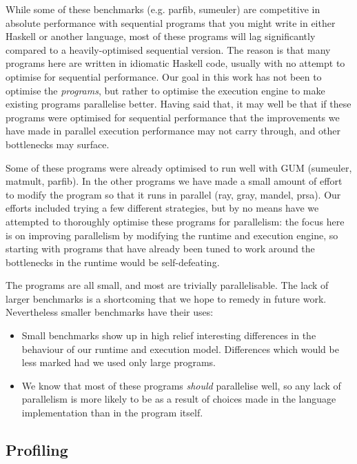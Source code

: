 \documentclass[twocolumn,9pt]{sigplanconf}
\begin{document}
While some of these benchmarks (e.g. parfib, sumeuler) are competitive
in absolute performance with sequential programs that you might write
in either Haskell or another language, most of these programs will lag
significantly compared to a heavily-optimised sequential version.  The
reason is that many programs here are written in idiomatic Haskell
code, usually with no attempt to optimise for sequential performance.
Our goal in this work has not been to optimise the \emph{programs},
but rather to optimise the execution engine to make existing programs
parallelise better.  Having said that, it may well be that if these
programs were optimised for sequential performance that the
improvements we have made in parallel execution performance may not
carry through, and other bottlenecks may surface.

Some of these programs were already optimised to run well with GUM
(sumeuler, matmult, parfib).  In the other programs we have made a
small amount of effort to modify the program so that it runs in
parallel (ray, gray, mandel, prsa).  Our efforts included trying a few
different strategies, but by no means have we attempted to thoroughly
optimise these programs for parallelism: the focus here is on
improving parallelism by modifying the runtime and execution engine,
so starting with programs that have already been tuned to work around
the bottlenecks in the runtime would be self-defeating.

The programs are all small, and most are trivially parallelisable.
The lack of larger benchmarks is a shortcoming that we hope to
remedy in future work.  Nevertheless smaller benchmarks have
their uses:

\begin{itemize}
\item Small benchmarks show up in high relief
  interesting differences in the behaviour of our runtime and
  execution model.  Differences which would be less marked had we
  used only large programs.
\item We know that most of these programs \emph{should} parallelise
  well, so any lack of parallelism is more likely to be as a result of
  choices made in the language implementation than in the program
  itself.  
\end{itemize}

\subsection{Profiling}
\label{s:viewer}
\end{document}
